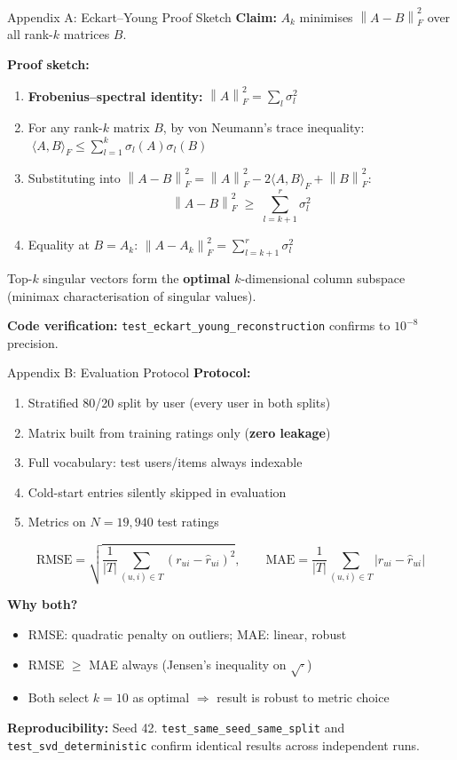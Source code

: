 \documentclass[10pt,t]{beamer}
\newcommand{\FroSq}[1]{\left\|#1\right\|_F^2}
\begin{document}
\appendix

\begin{frame}{Appendix A: Eckart--Young Proof Sketch}
  \textbf{Claim:} $A_k$ minimises $\FroSq{A-B}$ over all rank-$k$ matrices $B$.

  \textbf{Proof sketch:}
  \begin{enumerate}
    \item \textbf{Frobenius--spectral identity:}\;
          $\FroSq{A} = \sum_l\sigma_l^2$
    \item For any rank-$k$ matrix $B$, by von Neumann's trace inequality:
          $\;\langle A,B\rangle_F \leq \sum_{l=1}^k\sigma_l(A)\sigma_l(B)$
    \item Substituting into $\FroSq{A-B}=\FroSq{A}-2\langle A,B\rangle_F+\FroSq{B}$:
          \[
            \FroSq{A-B} \;\geq\; \sum_{l=k+1}^r\sigma_l^2
          \]
    \item Equality at $B = A_k$:\;
          $\FroSq{A-A_k} = \sum_{l=k+1}^r\sigma_l^2$ \checkmark
  \end{enumerate}

  Top-$k$ singular vectors form the \textbf{optimal} $k$-dimensional column subspace
  (minimax characterisation of singular values).

  \vspace{0.3em}
  \textbf{Code verification:}
  \texttt{test\_eckart\_young\_reconstruction} confirms to $10^{-8}$ precision.
\end{frame}

\begin{frame}{Appendix B: Evaluation Protocol}
  \textbf{Protocol:}
  \begin{enumerate}
    \item Stratified 80/20 split by user (every user in both splits)
    \item Matrix built from training ratings only (\textbf{zero leakage})
    \item Full vocabulary: test users/items always indexable
    \item Cold-start entries silently skipped in evaluation
    \item Metrics on $N = 19{,}940$ test ratings
  \end{enumerate}

  \[
    \text{RMSE} = \sqrt{\frac{1}{|T|}\sum_{(u,i)\in T}(r_{ui}-\hat{r}_{ui})^2},
    \qquad
    \text{MAE} = \frac{1}{|T|}\sum_{(u,i)\in T}|r_{ui}-\hat{r}_{ui}|
  \]

  \textbf{Why both?}
  \begin{itemize}
    \item RMSE: quadratic penalty on outliers; MAE: linear, robust
    \item RMSE $\geq$ MAE always (Jensen's inequality on $\sqrt{\cdot}$)
    \item Both select $k=10$ as optimal $\Rightarrow$ result is robust to metric choice
  \end{itemize}

  \textbf{Reproducibility:} Seed 42.
  \texttt{test\_same\_seed\_same\_split} and \texttt{test\_svd\_deterministic}
  confirm identical results across independent runs.
\end{frame}
\end{document}
